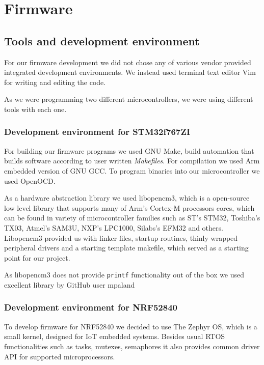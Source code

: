\section{ Firmware}

\subsection{ Tools and development environment}

For our firmware development we did not chose any of various vendor provided integrated development environments.
We instead used terminal text editor Vim for writing and editing the code.

As we were programming two different microcontrollers, we were using different tools with each one.


\subsubsection{ Development environment for STM32f767ZI}

For building our firmware programs we used GNU Make, build automation that builds software according to user written \textit{Makefiles}.
For compilation we used Arm embedded version of GNU GCC.
To program binaries into our microcontroller we used OpenOCD.

As a hardware abstraction library we used libopencm3, which is a open-source low level library that supports many of Arm's Cortex-M processors cores, which can be found in variety of microcontroller families such as ST's STM32, Toshiba's TX03, Atmel's SAM3U, NXP's LPC1000, Silabs's EFM32 and others.
Libopencm3 provided us with linker files, startup routines, thinly wrapped peripheral drivers and a starting template makefile, which served as a starting point for our project.

As libopencm3 does not provide \verb|printf| functionality out of the box we used excellent library by GitHub user mpaland \cite{printf_lib}


\subsubsection{ Development environment for NRF52840}

To develop firmware for NRF52840 we decided to use The Zephyr OS, which is a small kernel, designed for IoT embedded systems.
Besides usual RTOS functionalities such as tasks, mutexes, semaphores it also provides common driver API for supported microprocessors.

